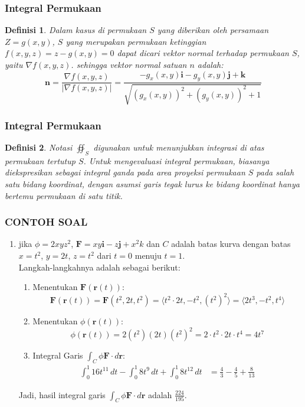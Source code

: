\documentclass[10pt]{beamer}
\newtheorem{definisi}{Definisi}
\begin{document}
\begin{frame}
\frametitle{Integral Permukaan}
\justifying
\begin{definisi}
    Dalam kasus di permukaan $S$ yang diberikan oleh persamaan $Z = g(x,y)$, $S$ yang merupakan permukaan ketinggian $f(x,y,z) = z - g(x,y) = 0$ dapat dicari vektor normal terhadap permukaan $S$, yaitu $\nabla f(x,y,z)$. sehingga vektor normal satuan $n$ adalah:
    \[\mathbf{n} = \dfrac{\nabla f(x,y,z)}{\lvert \nabla f(x,y,z) \rvert} = \dfrac{-g_{x}(x,y) \mathbf{i} - g_{y}(x,y)\mathbf{j} + \mathbf{k}}{\sqrt{(g_{x}(x,y))^{2} + (g_{y}(x,y))^{2} + 1}}\]
\end{definisi}
    
\end{frame}



\begin{frame}
    \frametitle{Integral Permukaan}
    \begin{definisi}
        Notasi $\oiint_S$ digunakan untuk menunjukkan integrasi di atas permukaan tertutup $S$. Untuk mengevaluasi integral permukaan, biasanya diekspresikan sebagai integral ganda pada area proyeksi permukaan $S$ pada salah satu bidang koordinat, dengan asumsi garis tegak lurus ke bidang koordinat hanya bertemu permukaan di satu titik.
    \end{definisi}
\end{frame}

\begin{frame}
\frametitle{CONTOH SOAL}
\justifying
\begin{enumerate}
\item jika $\phi = 2xyz^{2}$, $\mathbf{F} = xy \mathbf{i} - z \mathbf{j} + x^{2} k$ dan $C$ adalah batas kurva dengan batas $x = t^{2}$, $y = 2t$, $z = t^{2}$ dari $t = 0$ menuju $t = 1$.\\
Langkah-langkahnya adalah sebagai berikut:
\begin{enumerate}
    \item Menentukan \(\mathbf{F}(\mathbf{r}(t))\):
   \[
   \mathbf{F}(\mathbf{r}(t)) = \mathbf{F}(t^2, 2t, t^2) = \langle t^2 \cdot 2t, -t^2, (t^2)^2 \rangle = \langle 2t^3, -t^2, t^4 \rangle
   \]

  \item Menentukan \(\phi(\mathbf{r}(t))\):
   \[
   \phi(\mathbf{r}(t)) = 2 (t^2)(2t)(t^2)^2 = 2 \cdot t^2 \cdot 2t \cdot t^4 = 4t^7
   \]

  \item Integral Garis \(\int_C \phi \mathbf{F} \cdot d\mathbf{r}\):
\begin{align*}
   \int_0^1 16t^{11} \, dt - \int_0^1 8t^9 \, dt + \int_0^1 8t^{12} \, dt &= \frac{4}{3} - \frac{4}{5} + \frac{8}{13}
\end{align*}
\end{enumerate}

Jadi, hasil integral garis \(\int_C \phi \mathbf{F} \cdot d\mathbf{r}\) adalah \(\frac{224}{195}\).

\end{enumerate}
\end{frame}
\end{document}
